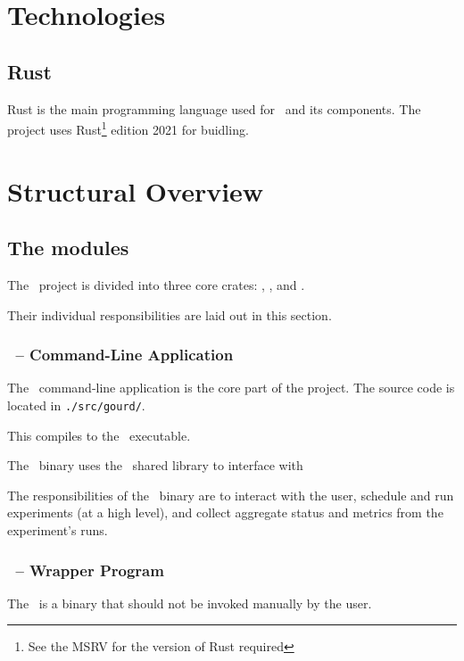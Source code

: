 \pagebreak

\section{Technologies}

\subsection{Rust}

Rust is the main programming language used for \gourd\ and its components.
The project uses Rust\footnote{See the MSRV for the version of Rust required}
edition 2021 for buidling.

\section{Structural Overview}\label{sec:architecture}

\subsection{The modules}

The \gourd\ project is divided into three core crates:
\gourd, \gourdlib, and \gourdwrap.

Their individual responsibilities are laid out in this section.

\subsubsection{\gourd\ -- Command-Line Application}

The \gourd\ command-line application is the core part of the project.
The source code is located in \verb|./src/gourd/|.

This compiles to the \gourd\ executable.

The \gourd\ binary uses the \gourdlib\ shared library to interface with

The responsibilities of the \gourd\ binary are to interact with the user,
schedule and run experiments (at a high level), and collect aggregate
status and metrics from the experiment's runs.

\subsubsection{\gourdwrap\ -- Wrapper Program}

The \gourdwrap\ is a binary that should not be invoked manually by the user.

